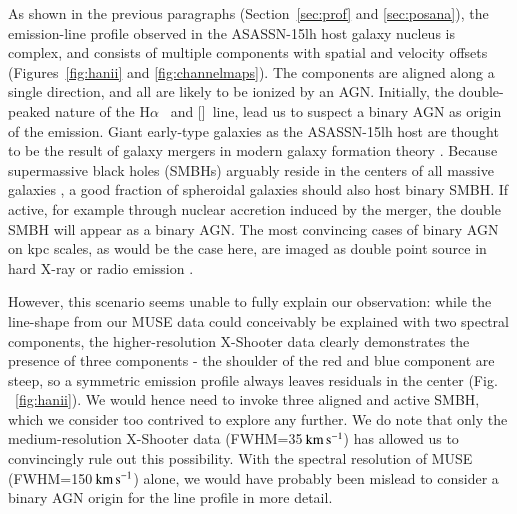 \documentclass[traditabstract]{aa}
\newcommand{\kms}{$\rm{km\,s^{-1}}$}
\newcommand{\ha}{H$\alpha$}
\newcommand{\nii}{[\ion{N}{ii}]}
\begin{document}
As shown in the previous paragraphs (Section~\ref{sec:prof} and \ref{sec:posana}), the emission-line profile observed in the ASASSN-15lh host galaxy nucleus is complex, and consists of multiple components with spatial and velocity offsets (Figures~\ref{fig:hanii} and \ref{fig:channelmaps}). The components are aligned along a single direction, and all are likely to be ionized by an AGN. Initially, the double-peaked nature of the \ha~ and \nii~line, lead us to suspect a binary AGN as origin of the emission. Giant early-type galaxies as the ASASSN-15lh host are thought to be the result of galaxy mergers in modern galaxy formation theory \citep[e.g.,][and references therein]{2006ApJS..163....1H}. Because supermassive black holes (SMBHs) arguably reside in the centers of all massive galaxies \citep[e.g.,][for a review]{2013ARA&A..51..511K}, a good fraction of spheroidal galaxies should also host binary SMBH. If active, for example through nuclear accretion induced by the merger, the double SMBH will appear as a binary AGN. The most convincing cases of binary AGN on kpc scales, as would be the case here, are imaged as double point source in hard X-ray \citep[e.g.,][]{2003ApJ...582L..15K, 2008MNRAS.386..105B} or radio emission \citep{2011ApJ...740L..44F, 2015ApJ...813..103M}.

However, this scenario seems unable to fully explain our observation: while the line-shape from our MUSE data could conceivably be explained with two spectral components, the higher-resolution X-Shooter data clearly demonstrates the presence of three components - the shoulder of the red and blue component are steep, so a symmetric emission profile always leaves residuals in the center (Fig. ~\ref{fig:hanii}). We would hence need to invoke three aligned and active SMBH, which we consider too contrived to explore any further. We do note that only the medium-resolution X-Shooter data (FWHM=35\,\kms) has allowed us to convincingly rule out this possibility. With the spectral resolution of MUSE (FWHM=150\,\kms) alone, we would have probably been mislead to consider a binary AGN origin for the line profile in more detail. 
\end{document}
